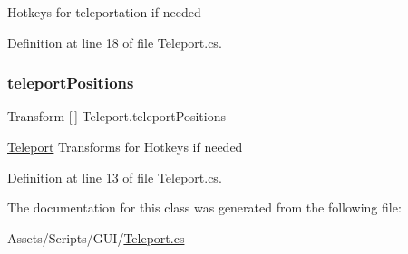 Hotkeys for teleportation if needed 



Definition at line 18 of file Teleport.\+cs.

\mbox{\label{class_teleport_a4225fffa27befd1f527d6fa4e6133dec}} 
\subsubsection{\texorpdfstring{teleport\+Positions}{teleportPositions}}
{\footnotesize\ttfamily Transform \mbox{[}$\,$\mbox{]} Teleport.\+teleport\+Positions}



\mbox{\hyperlink{class_teleport}{Teleport}} Transforms for Hotkeys if needed 



Definition at line 13 of file Teleport.\+cs.



The documentation for this class was generated from the following file\+:\begin{DoxyCompactItemize}
\item 
Assets/\+Scripts/\+G\+U\+I/\mbox{\hyperlink{_teleport_8cs}{Teleport.\+cs}}\end{DoxyCompactItemize}
